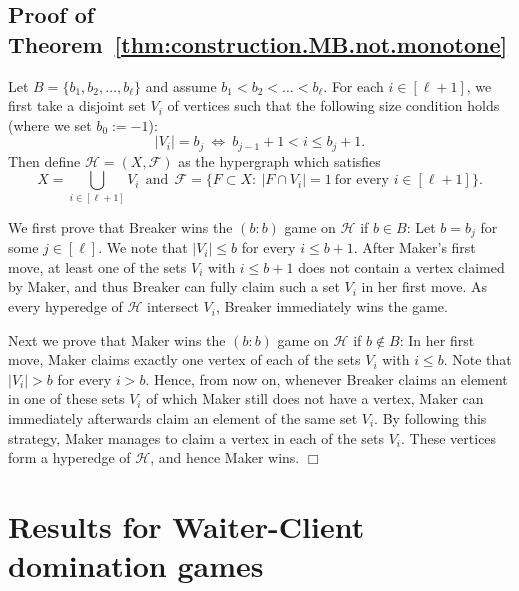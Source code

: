 \documentclass[reqno, 12pt]{amsart}
\numberwithin{equation}{section}
\numberwithin{figure}{section}
\newcommand{\calH}{\mathcal{H}}
\newcommand{\calF}{\mathcal{F}}
\begin{document}
\medskip

\subsection{Proof of Theorem~\ref{thm:construction.MB.not.monotone}}

Let $B=\{b_1,b_2,\ldots,b_{\ell}\}$ and assume
$b_1<b_2<\ldots<b_{\ell}$.
For each $i\in [\ell +1]$, we first take a disjoint set $V_i$ of vertices such that the following size condition holds (where we set $b_0:=-1$):
$$
|V_i| = b_j ~ \Leftrightarrow ~ b_{j-1} + 1 < i \leq b_j + 1 .
$$
Then define $\calH = (X,\calF)$ as the hypergraph which
satisfies
$$
X = \bigcup_{i\in [\ell +1]} V_i
~~ \text{and} ~~
\calF = \big\{ F\subset X:~ |F\cap V_i|=1~ \text{for every }i\in [\ell + 1] \big\} .
$$

We first prove that Breaker wins the $(b:b)$ game on $\calH$ 
if $b\in B$: Let $b=b_j$ for some $j\in [\ell]$.
We note that $|V_i|\leq b$ for every $i\leq b+1$.
After Maker's first move, at least one of the sets $V_i$ with
$i\leq b+1$ does not contain a vertex claimed by Maker,
and thus Breaker can fully claim such a set $V_i$ in her first move.
As every hyperedge of $\calH$ intersect $V_i$,
Breaker immediately wins the game. 

\smallskip

Next we prove that Maker wins the $(b:b)$ game on $\calH$ 
if $b\notin B$:
In her first move, Maker claims exactly one vertex of each of the sets
$V_i$ with $i\leq b$.
Note that $|V_i|>b$ for every $i> b$.
Hence, from now on, whenever Breaker claims an element
in one of these sets $V_i$ of which Maker still does not
have a vertex, Maker can immediately
afterwards claim an element of the same set $V_i$.
By following this strategy, Maker manages to claim a vertex in
each of the sets $V_i$. These vertices form a hyperedge of $\calH$,
and hence Maker wins. \hfill $\Box$












\section{Results for Waiter-Client domination games}\label{sec:WC.domination}
\end{document}
